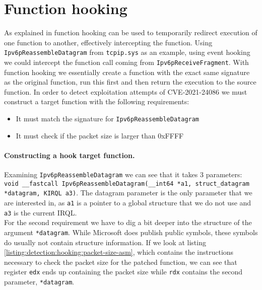 \documentclass{report}
\begin{document}
\section{Function hooking}
\label{sec:detection:function-hooking}

As explained in  function hooking can be used to temporarily redirect execution of one function to another, effectively intercepting the function. Using \texttt{Ipv6pReassembleDatagram} from \texttt{tcpip.sys} as an example, using event hooking we could intercept the function call coming from \texttt{Ipv6pReceiveFragment}. With function hooking we essentially create a function with the exact same signature as the original function, run this first and then return the execution to the source function. In order to detect exploitation attempts of CVE-2021-24086 we must construct a target function with the following requirements:

\begin{itemize}
    \item It must match the signature for \texttt{Ipv6pReassembleDatagram}
    \item It must check if the packet size is larger than 0xFFFF
\end{itemize} 

\paragraph{Constructing a hook target function.}
Examining \texttt{Ipv6pReassembleDatagram} we can see that it takes 3 parameters: \texttt{void __fastcall Ipv6pReassembleDatagram(__int64 *a1, struct_datagram *datagram, KIRQL a3)}. The datagram parameter is the only parameter that we are interested in, as \texttt{a1} is a pointer to a global structure that we do not use and \texttt{a3} is the current IRQL\cite{url:kernel:irql}.
\\
For the second requirement we have to dig a bit deeper into the structure of the argument \texttt{*datagram}. While Microsoft does publish public symbols, these symbols do usually not contain structure information. If we look at listing \ref{listing:detection:hooking:packet-size-asm}, which contains the instructions necessary to check the packet size for the patched function, we can see that register \texttt{edx} ends up containing the packet size while \texttt{rdx} contains the second parameter, \texttt{*datagram}.
\end{document}
